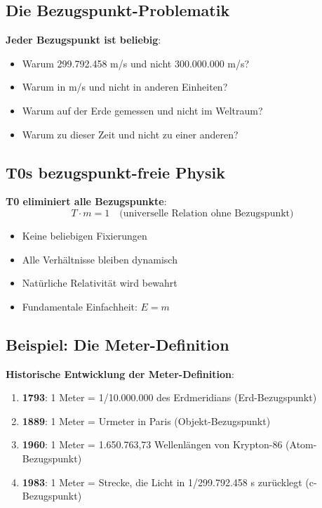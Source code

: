 \documentclass[12pt,a4paper]{article}
\newcommand{\Tfield}{T}
\begin{document}
	\subsection{Die Bezugspunkt-Problematik}
	
	\textbf{Jeder Bezugspunkt ist beliebig}:
	\begin{itemize}
		\item Warum 299.792.458 m/s und nicht 300.000.000 m/s?
		\item Warum in m/s und nicht in anderen Einheiten?
		\item Warum auf der Erde gemessen und nicht im Weltraum?
		\item Warum zu dieser Zeit und nicht zu einer anderen?
	\end{itemize}
	
	\subsection{T0s bezugspunkt-freie Physik}
	
	\textbf{T0 eliminiert alle Bezugspunkte}:
	\begin{equation}
		\Tfield \cdot m = 1 \quad \text{(universelle Relation ohne Bezugspunkt)}
	\end{equation}
	
	\begin{itemize}
		\item Keine beliebigen Fixierungen
		\item Alle Verhältnisse bleiben dynamisch
		\item Natürliche Relativität wird bewahrt
		\item Fundamentale Einfachheit: $E = m$
	\end{itemize}
	
	\subsection{Beispiel: Die Meter-Definition}
	
	\textbf{Historische Entwicklung der Meter-Definition}:
	\begin{enumerate}
		\item \textbf{1793}: 1 Meter = 1/10.000.000 des Erdmeridians (Erd-Bezugspunkt)
		\item \textbf{1889}: 1 Meter = Urmeter in Paris (Objekt-Bezugspunkt)  
		\item \textbf{1960}: 1 Meter = 1.650.763,73 Wellenlängen von Krypton-86 (Atom-Bezugspunkt)
		\item \textbf{1983}: 1 Meter = Strecke, die Licht in 1/299.792.458 s zurücklegt (c-Bezugspunkt)
	\end{enumerate}
	
\end{document}

